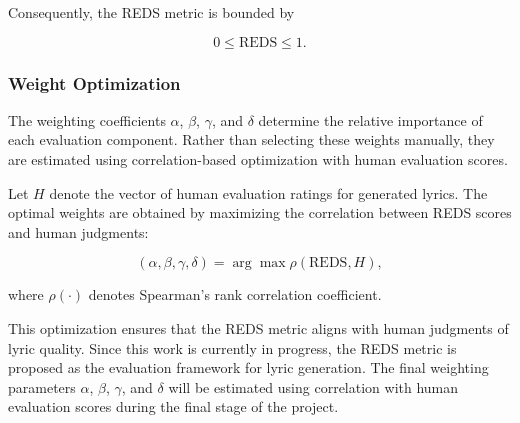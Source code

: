 \documentclass[11pt]{article}
\begin{document}
Consequently, the REDS metric is bounded by

\[
0 \le \text{REDS} \le 1.
\]

\subsubsection{Weight Optimization}

The weighting coefficients $\alpha$, $\beta$, $\gamma$, and $\delta$ determine the relative importance of each evaluation component. Rather than selecting these weights manually, they are estimated using correlation-based optimization with human evaluation scores.

Let $H$ denote the vector of human evaluation ratings for generated lyrics. The optimal weights are obtained by maximizing the correlation between REDS scores and human judgments:

\[
(\alpha,\beta,\gamma,\delta) = 
\arg\max
\rho(\text{REDS}, H),
\]

where $\rho(\cdot)$ denotes Spearman's rank correlation coefficient.

This optimization ensures that the REDS metric aligns with human judgments of lyric quality.
Since this work is currently in progress, the REDS metric is proposed as the evaluation framework for lyric generation. The final weighting parameters $\alpha$, $\beta$, $\gamma$, and $\delta$ will be estimated using correlation with human evaluation scores during the final stage of the project.




\end{document}
